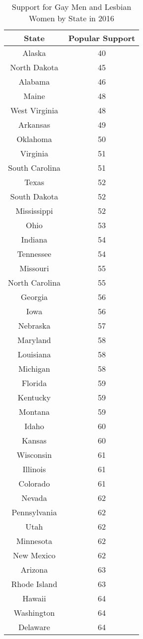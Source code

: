 \begin{spacing}{1}
\begin{longtable}{|c|c|}
\caption{Support for Gay Men and Lesbian Women by State in 2016}
\label{tab: pop_support}
\hline
\textbf{State} & \textbf{Popular Support}\\
\hline
Alaska & 40\\
North Dakota & 45\\
Alabama & 46\\
Maine & 48\\
West Virginia & 48\\
Arkansas & 49\\
Oklahoma & 50\\
Virginia & 51\\
South Carolina & 51\\
Texas & 52\\
South Dakota & 52\\
Mississippi & 52\\
Ohio & 53\\
Indiana & 54\\
Tennessee & 54\\
Missouri & 55\\
North Carolina & 55\\
Georgia & 56\\
Iowa & 56\\
Nebraska & 57\\
Maryland & 58\\
Louisiana & 58\\
Michigan & 58\\
Florida & 59\\
Kentucky & 59\\
Montana & 59\\
Idaho & 60\\
Kansas & 60\\
Wisconsin & 61\\
Illinois & 61\\
Colorado & 61\\
Nevada & 62\\
Pennsylvania & 62\\
Utah & 62\\
Minnesota & 62\\
New Mexico & 62\\
Arizona & 63\\
Rhode Island & 63\\
Hawaii & 64\\
Washington & 64\\
Delaware & 64\\

\end{longtable}
\end{spacing}
